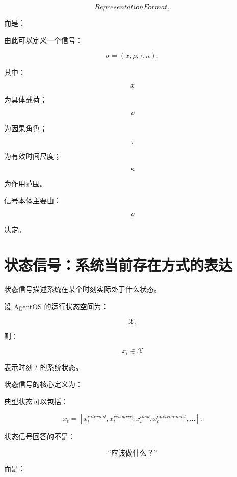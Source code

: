 \[
RepresentationFormat,
\]

而是：

\begin{statementbox}
\centering
{}
\end{statementbox}

由此可以定义一个信号：

\[
\sigma
=
(x,\rho,\tau,\kappa),
\]

其中：

\[
x
\]

为具体载荷；

\[
\rho
\]

为因果角色；

\[
\tau
\]

为有效时间尺度；

\[
\kappa
\]

为作用范围。

信号本体主要由：

\[
\rho
\]

决定。

\section{状态信号：系统当前存在方式的表达}

状态信号描述系统在某个时刻实际处于什么状态。

设 AgentOS 的运行状态空间为：

\[
\mathcal X.
\]

则：

\[
x_t\in\mathcal X
\]

表示时刻 $t$ 的系统状态。

状态信号的核心定义为：

\begin{statementbox}
\centering
{}
\end{statementbox}

典型状态可以包括：

\[
x_t
=
[
x_t^{internal},
x_t^{resource},
x_t^{task},
x_t^{environment},
\ldots
].
\]

状态信号回答的不是：

\[
\text{“应该做什么？”}
\]

而是：

\begin{statementbox}
\centering
{}
\end{statementbox}


